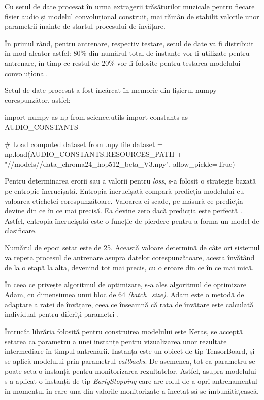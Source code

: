 \documentclass[a4paper,12pt]{report}
\begin{document}
Cu setul de date procesat în urma 
extragerii trăsăturilor muzicale pentru fiecare fișier audio 
și modelul convoluțional construit, mai rămân de stabilit 
valorile unor parametrii înainte de startul procesului de învățare. 

În primul rând, pentru antrenare, respectiv testare, setul de date va fi distribuit 
în mod aleator astfel: 80\% din 
numărul total de instanțe vor fi utilizate pentru antrenare, în timp 
ce restul de 20\% vor fi folosite pentru testarea modelului convoluțional.

\newpage
Setul de date procesat a fost încărcat în memorie din fișierul 
numpy corespunzător, astfel:
\begin{python}
    import numpy as np
    from science.utils import constants as AUDIO_CONSTANTS

    # Load computed dataset from .npy file
    dataset = np.load(AUDIO_CONSTANTS.RESOURCES_PATH 
                      + "//models//data_chroma24_hop512_beta_V3.npy", 
                      allow_pickle=True)
\end{python}

Pentru determinarea erorii sau a valorii pentru \emph{loss}, s-a folosit o strategie 
bazată pe entropie încrucișată. 
Entropia încrucișată 
compară predicția modelului cu valoarea etichetei corespunzătoare. 
Valoarea ei scade, pe măsură ce predicția devine din ce în ce mai precisă. 
Ea devine zero dacă predicția este perfectă \cite{Hands-On-Machine-Learning}.
Astfel, entropia încrucișată este o funcție de pierdere pentru a 
forma un model de clasificare.

Numărul de epoci setat este de 25. Această valoare determină de 
câte ori sistemul va repeta procesul de antrenare asupra datelor
corespunzătoare, acesta învățând de la o etapă la alta, devenind tot mai precis, 
cu o eroare din ce în ce mai mică.

În ceea ce privește algoritmul de optimizare, s-a 
ales algoritmul de optimizare Adam, cu dimensiunea unui bloc de 64 \emph{(batch{\_}size)}.
Adam este o metodă de adaptare a ratei de învățare, ceea ce înseamnă că rata de învățare
este calculată individual pentru diferiți parametri \cite{Hands-On-Machine-Learning}.

Întrucât librăria folosită pentru construirea modelului este Keras, 
se acceptă setarea ca parametru a unei instanțe pentru 
vizualizarea unor rezultate intermediare în timpul antrenării. Instanța este 
un obiect de tip TensorBoard, și se aplică modelului prin parametrul \emph{callbacks}.
De asemenea, tot ca parametru se poate seta o instanță pentru 
monitorizarea rezultatelor. Astfel, asupra modelului s-a aplicat o instanță de tip \emph{EarlyStopping} 
care are rolul de a opri antrenamentul în momentul în care una din
valorile monitorizate a încetat să se îmbunătățească. 
\end{document}
